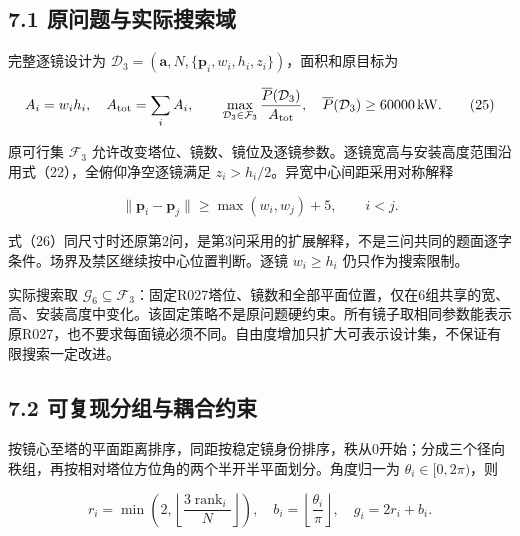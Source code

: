 \documentclass[UTF8,fontset=windows,zihao=-4]{ctexart}
\begin{document}
\subsection*{7.1 原问题与实际搜索域}

\par\noindent\begin{minipage}{\linewidth}
完整逐镜设计为 \(\mathcal D_3=(\boldsymbol a,N,\{\boldsymbol p_i,w_i,h_i,z_i\})\)，面积和原目标为

\[
A_i=w_ih_i,\quad A_{\rm tot}=\sum_iA_i,\qquad
\max_{\mathcal D_3\in\mathcal F_3}\frac{\overline P(\mathcal D_3)}{A_{\rm tot}},
\quad\overline P(\mathcal D_3)\ge60000\,\mathrm{kW}.
\tag{25}
\]
\end{minipage}\par

\par\noindent\begin{minipage}{\linewidth}
原可行集 \(\mathcal F_3\) 允许改变塔位、镜数、镜位及逐镜参数。逐镜宽高与安装高度范围沿用式（22），全俯仰净空逐镜满足 \(z_i>h_i/2\)。异宽中心间距采用对称解释

\[
\|\boldsymbol p_i-\boldsymbol p_j\|\ge\max(w_i,w_j)+5,\qquad i<j.
\tag{26}
\]
\end{minipage}\par

式（26）同尺寸时还原第2问，是第3问采用的扩展解释，不是三问共同的题面逐字条件。场界及禁区继续按中心位置判断。逐镜 \(w_i\ge h_i\) 仍只作为搜索限制。

实际搜索取 \(\mathcal G_6\subseteq\mathcal F_3\)：固定R027塔位、镜数和全部平面位置，仅在6组共享的宽、高、安装高度中变化。该固定策略不是原问题硬约束。所有镜子取相同参数能表示原R027，也不要求每面镜必须不同。自由度增加只扩大可表示设计集，不保证有限搜索一定改进。

\subsection*{7.2 可复现分组与耦合约束}

\par\noindent\begin{minipage}{\linewidth}
按镜心至塔的平面距离排序，同距按稳定镜身份排序，秩从0开始；分成三个径向秩组，再按相对塔位方位角的两个半开半平面划分。角度归一为 \(\theta_i\in[0,2\pi)\)，则

\[
r_i=\min\!\left(2,\left\lfloor\frac{3\operatorname{rank}_i}{N}\right\rfloor\right),
\quad b_i=\left\lfloor\frac{\theta_i}{\pi}\right\rfloor,
\quad g_i=2r_i+b_i.
\tag{27}
\]
\end{minipage}\par
\end{document}
